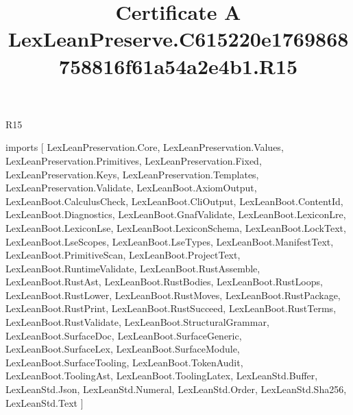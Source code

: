 \begin{lexlean}{R15}
\title{Certificate A LexLeanPreserve.C615220e1769868758816f61a54a2e4b1.R15}
\begin{coremodule}
imports [
  LexLeanPreservation.Core,
  LexLeanPreservation.Values,
  LexLeanPreservation.Primitives,
  LexLeanPreservation.Fixed,
  LexLeanPreservation.Keys,
  LexLeanPreservation.Templates,
  LexLeanPreservation.Validate,
  LexLeanBoot.AxiomOutput,
  LexLeanBoot.CalculusCheck,
  LexLeanBoot.CliOutput,
  LexLeanBoot.ContentId,
  LexLeanBoot.Diagnostics,
  LexLeanBoot.GnafValidate,
  LexLeanBoot.LexiconLre,
  LexLeanBoot.LexiconLse,
  LexLeanBoot.LexiconSchema,
  LexLeanBoot.LockText,
  LexLeanBoot.LseScopes,
  LexLeanBoot.LseTypes,
  LexLeanBoot.ManifestText,
  LexLeanBoot.PrimitiveScan,
  LexLeanBoot.ProjectText,
  LexLeanBoot.RuntimeValidate,
  LexLeanBoot.RustAssemble,
  LexLeanBoot.RustAst,
  LexLeanBoot.RustBodies,
  LexLeanBoot.RustLoops,
  LexLeanBoot.RustLower,
  LexLeanBoot.RustMoves,
  LexLeanBoot.RustPackage,
  LexLeanBoot.RustPrint,
  LexLeanBoot.RustSucceed,
  LexLeanBoot.RustTerms,
  LexLeanBoot.RustValidate,
  LexLeanBoot.StructuralGrammar,
  LexLeanBoot.SurfaceDoc,
  LexLeanBoot.SurfaceGeneric,
  LexLeanBoot.SurfaceLex,
  LexLeanBoot.SurfaceModule,
  LexLeanBoot.SurfaceTooling,
  LexLeanBoot.TokenAudit,
  LexLeanBoot.ToolingAst,
  LexLeanBoot.ToolingLatex,
  LexLeanStd.Buffer,
  LexLeanStd.Json,
  LexLeanStd.Numeral,
  LexLeanStd.Order,
  LexLeanStd.Sha256,
  LexLeanStd.Text
]


\end{coremodule}
\end{lexlean}
